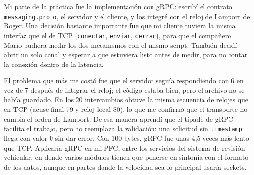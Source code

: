 Mi parte de la práctica fue la implementación con gRPC: escribí el contrato \texttt{messaging.proto}, el servidor y el cliente, y los integré con el reloj de Lamport de Roger. Una decisión bastante importante fue que mi cliente tuviera la misma interfaz que el de TCP (\texttt{conectar}, \texttt{enviar}, \texttt{cerrar}), para que el compañero Mario pudiera medir los dos mecanismos con el mismo script. También decidí abrir un solo canal y esperar a que estuviera listo antes de medir, para no contar la conexión dentro de la latencia.

El problema que más me costó fue que el servidor seguía respondiendo con 6 en vez de 7 después de integrar el reloj; el código estaba bien, pero el archivo no se había guardado. En los 20 intercambios obtuve la misma secuencia de relojes que en TCP (acuse final 79 y reloj local 80), lo que me confirmó que el transporte no cambia el orden de Lamport. De esa manera aprendí que el tipado de gRPC facilita el trabajo, pero no reemplaza la validación: una solicitud sin \texttt{timestamp} llega con valor 0 sin dar error. Con 100 bytes, gRPC fue unas 4,5 veces más lento que TCP.
Aplicaría gRPC en mi PFC, entre los servicios del sistema de revisión vehicular, en donde varios módulos tienen que ponerse en sintonía con el formato de los datos, aunque en partes donde la velocidad sea lo principal usaría sockets.
